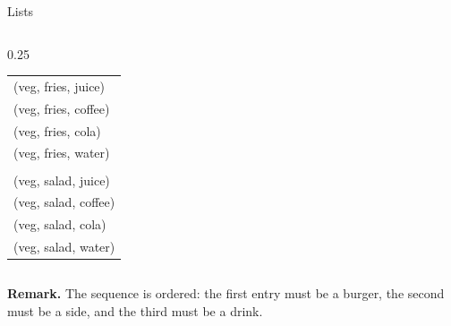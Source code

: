\documentclass[dvipsnames, 10pt]{beamer}
\begin{document}
\begin{frame}{Lists}
\begin{columns}[t]
  \begin{column}{0.25\textwidth}
    \begin{tabular}{l}
      (veg, fries, juice) \\
      (veg, fries, coffee) \\
      (veg, fries, cola) \\
      (veg, fries, water) \\
      \\
      (veg, salad, juice) \\
      (veg, salad, coffee) \\
      (veg, salad, cola) \\
      (veg, salad, water) \\
    \end{tabular}
  \end{column}
\end{columns}
\pause \vfill 

\colorbox{red!30}{\textbf{Remark.}}  The sequence is \alert{ordered}: the first entry must be a burger, the second must be a side, and the third must be a drink.

\end{frame}
\end{document}
